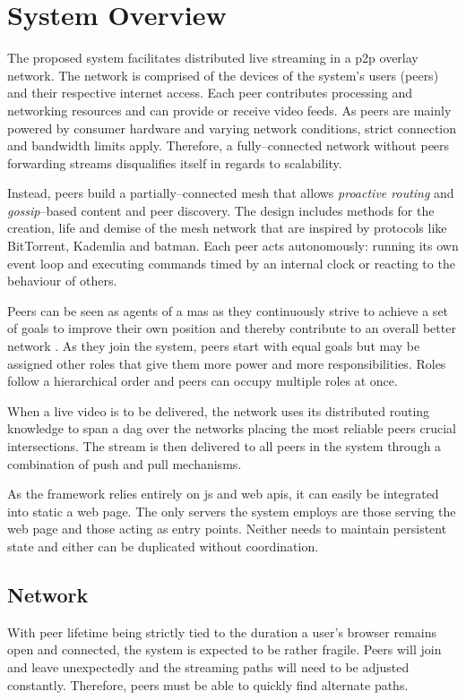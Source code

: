 \section{System Overview}\label{sec:design-system-overview}

The proposed system facilitates distributed live streaming in a \gls{p2p} overlay network. The network is comprised of the devices of the system's users (peers) and their respective internet access. Each peer contributes processing and networking resources and can provide or receive video feeds. As peers are mainly powered by consumer hardware and varying network conditions, strict connection and bandwidth limits apply. Therefore, a fully–connected network without peers forwarding streams disqualifies itself in regards to scalability.

Instead, peers build a partially–connected mesh that allows \textit{proactive routing} and \textit{gossip}–based content and peer discovery. The design includes methods for the creation, life and demise of the mesh network that are inspired by protocols like BitTorrent, Kademlia and \gls{batman}. Each peer acts autonomously: running its own event loop and executing commands timed by an internal clock or reacting to the behaviour of others.

Peers can be seen as agents of a \gls{mas} \cite{bdi-agents-theory-practice} as they continuously strive to achieve a set of goals to improve their own position and thereby contribute to an overall better network \cite[\SV.B]{coolstreaming-design-theory}.
As they join the system, peers start with equal goals but may be assigned other roles that give them more power and more responsibilities. Roles follow a hierarchical order and peers can occupy multiple roles at once.

When a live video is to be delivered, the network uses its distributed routing knowledge to span a \gls{dag} over the networks placing the most reliable peers crucial intersections. The stream is then delivered to all peers in the system through a combination of push and pull mechanisms.

As the framework relies entirely on \gls{js} and web \glspl{api}, it can easily be integrated into static a web page. The only servers the system employs are those serving the web page and those acting as entry points. Neither needs to maintain persistent state and either can be duplicated without coordination.

\subsection{Network}
With peer lifetime being strictly tied to the duration a user's browser remains open and connected, the system is expected to be rather fragile. Peers will join and leave unexpectedly and the streaming paths will need to be adjusted constantly. Therefore, peers must be able to quickly find alternate paths.

